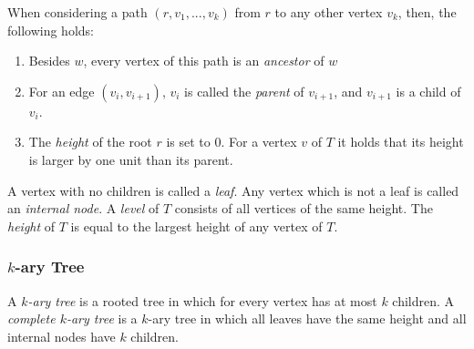 When considering a path $(r,v_1,...,v_k)$ from $r$ to any other vertex $v_k$, then, the following holds:
\begin{enumerate}
	\item Besides $w$, every vertex of this path is an \emph{ancestor} of $w$
	\item For an edge $(v_i,v_{i+1})$, $v_i$ is called the \emph{parent} of $v_{i+1}$, and $v_{i+1}$ is a child of $v_i$.
	\item The \emph{height} of the root $r$ is set to 0. For a vertex $v$ of $T$ it holds that its height is larger by one unit than its parent.
\end{enumerate}
A vertex with no children is called a \emph{leaf}. Any vertex which is not a leaf is called an \emph{internal node}.
A \emph{level} of $T$ consists of all vertices of the same height.
The \emph{height} of $T$ is equal to the largest height of any vertex of $T$. \cite[P. 1176ff]{DBLP:cormen_intro_to_algorithms}
\subsubsection{$k$-ary Tree}
A \emph{$k$-ary tree} is a rooted tree in which for every vertex has at most $k$ children.
A \emph{complete $k$-ary tree} is a $k$-ary tree in which all leaves have the same height and all internal nodes have $k$ children.
